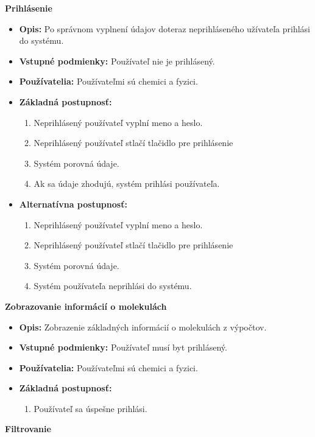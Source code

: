 \documentclass[12pt,a4paper]{article}
\begin{document}
\begin{enumerate}[label={[UC-\arabic*]}]
	\item {\bf Prihlásenie}
	\begin{itemize}
		\item{\bf Opis: } Po správnom vyplnení údajov doteraz neprihláseného užívateľa prihlási do systému.
		\item{\bf Vstupné podmienky: } Používateľ nie je prihlásený.
		\item{\bf Používatelia: } Používateľmi sú chemici a fyzici.
		\item{\bf Základná postupnosť: }
		\begin{enumerate}[label={\arabic*.}]
			\item Neprihlásený používateľ vyplní meno a heslo.
			\item Neprihlásený používateľ stlačí tlačidlo pre prihlásenie
			\item Systém porovná údaje.
			\item Ak sa údaje zhodujú, systém prihlási používateľa.
		\end{enumerate}
		\item{\bf Alternatívna postupnosť: }
		\begin{enumerate}[label={\arabic*.}]
			\item Neprihlásený používateľ vyplní meno a heslo.
			\item Neprihlásený používateľ stlačí tlačidlo pre prihlásenie
			\item Systém porovná údaje.
			\item Systém používateľa neprihlási do systému.
		\end{enumerate}
	\end{itemize}
	\item {\bf Zobrazovanie informácií o molekulách}
	\begin{itemize}
		\item{\bf Opis: } Zobrazenie základných informácií o molekulách z výpočtov.
		\item{\bf Vstupné podmienky: } Používateľ musí byt prihlásený.
		\item{\bf Používatelia: } Používateľmi sú chemici a fyzici.
		\item{\bf Základná postupnosť: }
		\begin{enumerate}[label={\arabic*.}]
			\item Používateľ sa úspešne prihlási.
		\end{enumerate}
	\end{itemize}
	\item {\bf Filtrovanie}

\end{enumerate}
\end{document}
